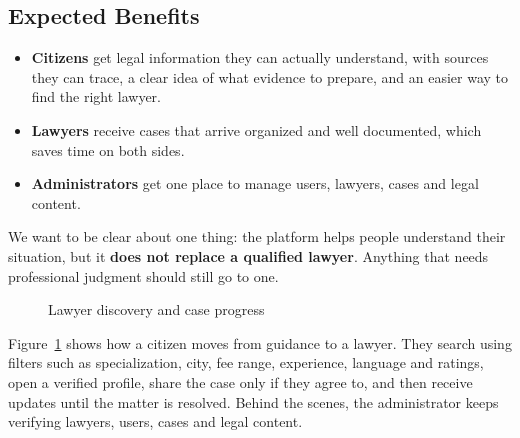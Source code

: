 \documentclass[12pt,a4paper]{report}
\begin{document}
\subsection{Expected Benefits}
\begin{itemize}
  \item \textbf{Citizens} get legal information they can actually understand, with sources they can trace, a clear idea of what evidence to prepare, and an easier way to find the right lawyer.
  \item \textbf{Lawyers} receive cases that arrive organized and well documented, which saves time on both sides.
  \item \textbf{Administrators} get one place to manage users, lawyers, cases and legal content.
\end{itemize}
We want to be clear about one thing: the platform helps people understand their situation, but it \textbf{does not replace a qualified lawyer}. Anything that needs professional judgment should still go to one.

\begin{figure}[H]
\centering
{}
\caption{Lawyer discovery and case progress}
\label{fig:lawyer}
\end{figure}

Figure~\ref{fig:lawyer} shows how a citizen moves from guidance to a lawyer. They search using filters such as specialization, city, fee range, experience, language and ratings, open a verified profile, share the case only if they agree to, and then receive updates until the matter is resolved. Behind the scenes, the administrator keeps verifying lawyers, users, cases and legal content.
\end{document}
